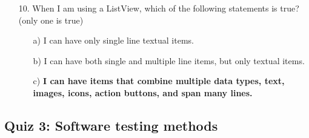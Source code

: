 \documentclass[12pt]{article}
\begin{document}
\begin{itemize}
    \item[10.] When I am using a ListView, which of the following statements is true? (only one is true)
    \begin{itemize}
        \item[a)] I can have only single line textual items.
        \item[b)] I can have both single and multiple line items, but only textual items.
        \item[c)] \textbf{I can have items that combine multiple data types, text, images, icons, action buttons, and span many lines.}
    \end{itemize}

\end{itemize}

\subsection*{Quiz 3: Software testing methods}
\end{document}
